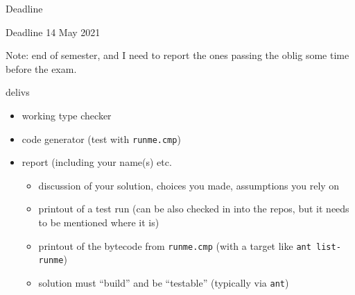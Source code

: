 \documentclass{beamer}
\begin{document}
\begin{frame}[label={sec:orgcdc0267},fragile]{Deadline}
 \begin{alertblock}{Deadline}
14 May 2021
\end{alertblock}


Note: end of semester, and I need to report the ones passing the oblig some
time before the exam.


\begin{block}{delivs}
\begin{itemize}
\item working type checker
\item code generator (test with \texttt{runme.cmp})
\item report (including your name(s) etc.

\begin{itemize}
\item discussion of your solution, choices you made, assumptions you rely on

\item printout of a test run (can be also checked in into the repos, but it 
needs to be mentioned where it is)
\item printout of the bytecode from \texttt{runme.cmp} (with a target like \texttt{ant
    list-runme})

\item solution must ``build'' and be ``testable'' (typically via \texttt{ant})
\end{itemize}
\end{itemize}
\end{block}
\end{frame}





\end{document}
